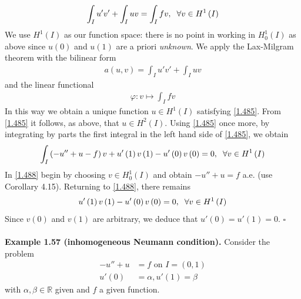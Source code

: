 \documentclass[a4paper,oneside]{book}
\numberwithin{equation}{chapter}
\begin{document}
\begin{align}
\label{1.485}
\int_I {u'v'}  + \int_I {uv}  = \int_I {fv} ,\hspace{0.2cm} \forall v \in {H^1}\left( I \right)
\end{align}
We use $H^1\left(I\right)$ as our function space: there is no point in working in $H_0^1\left(I\right)$ as above since $u\left(0\right)$ and $u\left(1\right)$ are a priori \textit{unknown}. We apply the Lax-Milgram theorem with the bilinear form 
\begin{align}
a\left( {u,v} \right) = \int_I {u'v'}  + \int_I {uv} 
\end{align}
and the linear functional 
\begin{align}
\varphi :v \mapsto \int_I {fv} 
\end{align}
In this way we obtain a unique function $u\in H^1\left(I\right)$ satisfying \eqref{1.485}. From \eqref{1.485} it follows, as above, that $u\in H^2\left(I\right)$. Using \eqref{1.485} once more, by integrating by parts the first integral in the left hand side of \eqref{1.485}, we obtain
\begin{align}
\label{1.488}
\int_I {\left( { - u'' + u - f} \right)v}  + u'\left( 1 \right)v\left( 1 \right) - u'\left( 0 \right)v\left( 0 \right) = 0,\hspace{0.2cm}\forall v \in {H^1}\left( I \right)
\end{align}
In \eqref{1.488} begin by choosing $v\in H_0^1\left(I\right)$ and obtain $-u''+u=f$ a.e. (use Corollary 4.15). Returning to \eqref{1.488}, there remains
\begin{align}
u'\left( 1 \right)v\left( 1 \right) - u'\left( 0 \right)v\left( 0 \right) = 0,\hspace{0.2cm} \forall v \in {H^1}\left( I \right)
\end{align}
Since $v\left(0\right)$ and $v\left(1\right)$ are arbitrary, we deduce that $u'\left(0\right)=u'\left(1\right)=0$. \hfill $\square$\\
\\
\textbf{Example 1.57 (inhomogeneous Neumann condition).} Consider the problem
\begin{align}
\label{1.490}
 - u'' + u &= f\mbox{ on } I = \left( {0,1} \right)\\
u'\left( 0 \right) &= \alpha ,u'\left( 1 \right) = \beta  \label{1.491}
\end{align}
with $\alpha,\beta \in \mathbb{R}$ given and $f$ a given function.\\
\\
\end{document}

